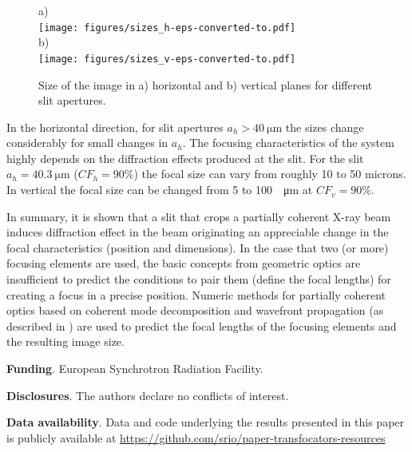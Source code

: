 \documentclass[9pt,twocolumn,twoside]{osajnl}
\begin{document}
\begin{figure}[H]
a)\\
\hspace{-2.0cm}
    \texttt{[image: figures/sizes\_h-eps-converted-to.pdf]}\\
b)\\
\hspace{-2.0cm}
    \texttt{[image: figures/sizes\_v-eps-converted-to.pdf]}

    \caption{
    \label{fig:focalSizes}
    Size of the image in a) horizontal and b) vertical planes for different slit apertures.
    }
\end{figure}

In the horizontal direction, for slit apertures $a_h>\SI{40}{\micro\meter}$ the sizes change considerably for small changes in $a_h$. The focusing characteristics of the system highly depends on the diffraction effects produced at the slit. For the slit $a_h=\SI{40.3}{\micro\meter}$ ($CF_h=90\%$) the focal size can vary from roughly 10 to 50 microns. In vertical the focal size can be changed from 5 to 100~\SI{}{\micro\meter} at $CF_v=90\%$.

In summary, it is shown that a slit that crops a partially coherent X-ray beam induces diffraction effect in the beam originating an appreciable change in the focal characteristics (position and dimensions). In the case that two (or more) focusing elements are used, the basic concepts from geometric optics are insufficient to predict the conditions to pair them (define the focal lengths) for creating a focus in a precise position. Numeric methods for partially coherent optics based on coherent mode decomposition and wavefront propagation (as described in \cite{delrio2021pairing}) are used to predict the focal lengths of the focusing elements and the resulting image size.   

\textbf{Funding}. European Synchrotron Radiation Facility.


\textbf{Disclosures}. The authors declare no conflicts of interest.

\textbf{Data availability}. Data and code underlying the results presented in this paper is publicly available at \url{https://github.com/srio/paper-transfocators-resources}

\end{document}
